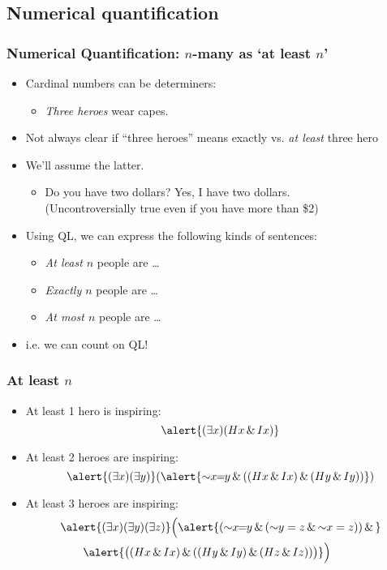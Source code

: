 \subsection{Numerical quantification}

\begin{frame}
    \frametitle{Numerical Quantification: $n$-many as `at least $n$'}

\begin{itemize}[<+->]
\item Cardinal numbers can be determiners:
\begin{itemize}
\item \emph{Three heroes} wear capes.
\end{itemize}
\item Not always clear if ``three heroes'' means \textcolor{highlightB}{exactly} vs. \emph{at least} three hero
\item We'll assume the \textcolor{highlightA}{latter}.%
\begin{itemize}[<+->]
\item Do you have two dollars? Yes, I have two dollars. \\ (Uncontroversially true even if you have more than \$2)
\end{itemize}
\item Using QL, we can express the following kinds of sentences:
\begin{itemize}[<+->]
\item \emph{At least $n$} people are \dots
\item \emph{Exactly $n$} people are \dots
\item \emph{At most $n$} people are \dots
\end{itemize}
\item i.e. we can count on QL! 
\end{itemize}
\end{frame}

\begin{frame}
    \frametitle{At least $n$}

\begin{itemize}[<+->]
\item At least 1 hero is inspiring:
\[
\alert{\qt{\exists}{x}(H\qv{x} \land I\qv{x})}
\]
\item At least 2 heroes are inspiring:
\[
\alert{\qt{\exists}{x}\qt{\exists}{y}}(\alert{\enot x\!\!=\!\!y \land ((H\qv{x} \land I\qv{x}) \land (H\qv{y} \land I\qv{y}))})
\]
\item At least 3 heroes are inspiring:
\begin{align*}
& \alert{\qt{\exists}{x}\qt{\exists}{y}\qt{\exists}{z}}\Big(\alert{(\enot x\!\!=\!\!y \land (\enot y = z \land \enot x = z)) \eand {}} \\
& \qquad \alert{\big((H\qv{x} \land I\qv{x}) \land ((H\qv{y} \land I\qv{y}) \eand (H\qv{z} \land I\qv{z}))\big)}\Big)
\end{align*}
\end{itemize}
\end{frame}


